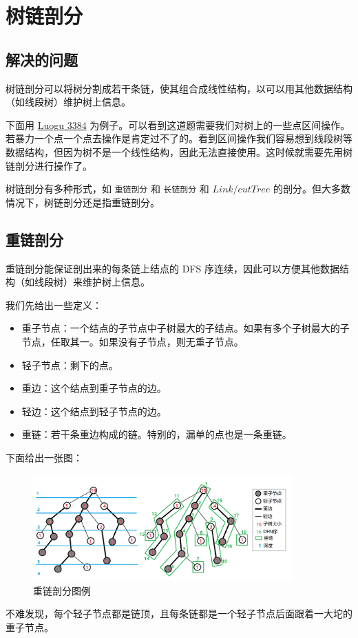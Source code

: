 \documentclass[10pt,twoside,a4paper,UTF8]{ctexbook}
\begin{document}
	\section{树链剖分}
	\subsection{解决的问题}
	树链剖分可以将树分割成若干条链，使其组合成线性结构，以可以用其他数据结构（如线段树）维护树上信息。\par
	下面用 \href{https://www.luogu.com.cn/problem/P3384}{Luogu 3384} 为例子。可以看到这道题需要我们对树上的一些点区间操作。若暴力一个点一个点去操作是肯定过不了的。看到区间操作我们容易想到线段树等数据结构，但因为树不是一个线性结构，因此无法直接使用。这时候就需要先用树链剖分进行操作了。\par
	树链剖分有多种形式，如 \texttt{重链剖分} 和 \texttt{长链剖分} 和 $Link/cut Tree$ 的剖分。但大多数情况下，树链剖分还是指重链剖分。\par
	\subsection{重链剖分}
	重链剖分能保证剖出来的每条链上结点的 DFS 序连续，因此可以方便其他数据结构（如线段树）来维护树上信息。\par
	我们先给出一些定义：
	\begin{itemize}
		\item 重子节点：一个结点的子节点中子树最大的子结点。如果有多个子树最大的子节点，任取其一。如果没有子节点，则无重子节点。
		\item 轻子节点：剩下的点。
		\item 重边：这个结点到重子节点的边。
		\item 轻边：这个结点到轻子节点的边。
		\item 重链：若干条重边构成的链。特别的，漏单的点也是一条重链。
	\end{itemize}
	下面给出一张图：
	\begin{figure}[H]
		\centering
		\includegraphics[width=10cm]{picture/图论/树/1.png}
		\caption{重链剖分图例}
	\end{figure}\par
	不难发现，每个轻子节点都是链顶，且每条链都是一个轻子节点后面跟着一大坨的重子节点。
	
\end{document}
